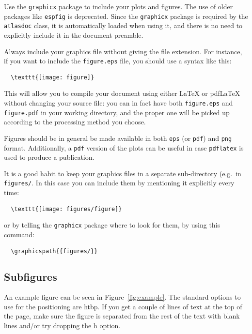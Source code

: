 \documentclass[UKenglish]{latex/atlasdoc}
\newcommand{\File}[1]{\texttt{#1}\xspace}
\newcommand{\Option}[1]{\textsf{#1}\xspace}
\newcommand{\Package}[1]{\texttt{#1}\xspace}
\begin{document}
Use the \Package{graphicx} package to include your plots and figures. 
The use of older packages like \Package{espfig} is deprecated.
Since the \Package{graphicx} package is required by the \Package{atlasdoc}
class, it is automatically loaded when using it, and there is no need
to explicitly include it in the document preamble.

Always include your graphics file without giving the file extension.
For instance, if you want to include the \File{figure.eps}
file, you should use a syntax like this:
\begin{verbatim}
  \texttt{[image: figure]}
\end{verbatim}
This will allow you to compile your document using either \LaTeX{} or
pdf\LaTeX{} without changing your source file: you can in fact have
both \File{figure.eps} and \File{figure.pdf} in your working directory,
and the proper one will be picked up according to the processing method
you choose.

Figures should be in general be made available in both \texttt{eps} (or \texttt{pdf}) and 
\texttt{png} format. Additionally, a \texttt{pdf} version of the plots can be
useful in case \verb|pdflatex| is used to produce a publication.

It is a good habit to keep your graphics files in a separate
sub-directory (e.g.\ in \File{figures/}. 
In this case you can include them by mentioning it explicitly every time:
\begin{verbatim}
  \texttt{[image: figures/figure]}
\end{verbatim}
or by telling the \Package{graphicx} package where to look
for them, by using this command:
\begin{verbatim}
  \graphicspath{{figures/}}
\end{verbatim}


\subsection{Subfigures}

An example figure can be seen in Figure~\ref{fig:example}.
The standard options to use for the positioning are \Option{htbp}.
If you get a couple of lines of text at the top of the page,
make sure the figure is separated from the rest of the text with blank lines and/or try dropping the \Option{h} option.
\end{document}

